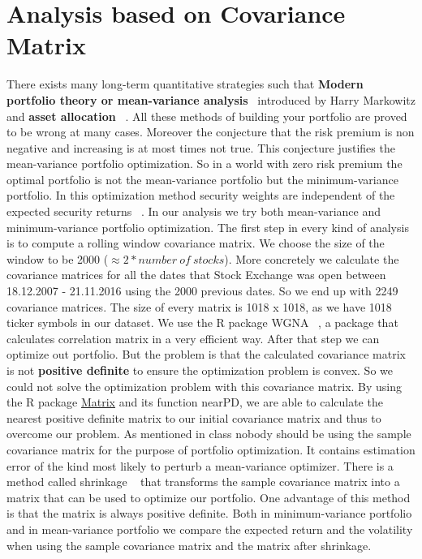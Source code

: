 \documentclass[letterpaper,12pt]{article}
\begin{document}
\section{Analysis based on Covariance Matrix}
\par There exists many long-term quantitative strategies such that \textbf{Modern portfolio theory or mean-variance analysis}~\cite{Markowitz} introduced by Harry Markowitz and \textbf{asset allocation} ~\cite{Asset}. All these methods of building your portfolio are proved to be wrong at many cases. Moreover the conjecture that the risk premium is non negative and increasing is at most times not true. This conjecture justifies the mean-variance portfolio optimization. So in a world with zero risk premium the optimal portfolio is not the mean-variance portfolio but the minimum-variance portfolio. In this optimization method security weights are independent of the expected security returns ~\cite{Min-variance}. In our analysis we try both mean-variance and minimum-variance portfolio optimization. \newline
The first step in every kind of analysis is to compute a rolling window covariance matrix. We choose the size of the window to be 2000 ($\approx 2 * number\ of\ stocks$). More concretely we calculate the covariance matrices for all the dates that Stock Exchange was open between 18.12.2007 - 21.11.2016 using the 2000 previous dates. So we end up with 2249 covariance matrices. The size of every matrix is 1018 x 1018, as we have 1018 ticker symbols in our dataset. We use the R package WGNA ~\cite{WGCNA}, a package that calculates correlation matrix in a very efficient way. After that step we can optimize out portfolio. But the problem is that the calculated covariance matrix is not \textbf{positive definite} to ensure the optimization problem is convex. So we could not solve the optimization problem with this covariance matrix. By using the R package \href{https://cran.r-project.org/web/packages/Matrix/Matrix.pdf}{Matrix} and its function nearPD, we are able to calculate the nearest positive definite matrix to our initial covariance matrix and thus to overcome our problem. \newline
As mentioned in class nobody should be using the sample covariance matrix for the purpose of portfolio optimization. It contains estimation error of the kind most likely to perturb a mean-variance optimizer. There is a method called shrinkage ~\cite{LW} that transforms the sample covariance matrix into a matrix that can be used to optimize our portfolio. One advantage of this method is that the matrix is always positive definite. Both in minimum-variance portfolio and in mean-variance portfolio we compare the expected return and the volatility when using the sample covariance matrix and the matrix after shrinkage.
\end{document}
